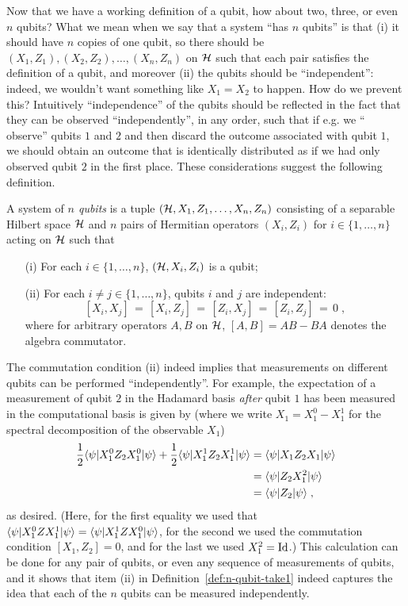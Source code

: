 Now that we have a working definition of a qubit, how about two, three, or even $n$ qubits? What we mean when we say that a system ``has $n$ qubits'' is that (i) it should have $n$ copies of one qubit, so there should be $(X_1,Z_1), (X_2,Z_2),\ldots,(X_n,Z_n)$ on $\mathcal{H}$ such that each pair satisfies the definition of a qubit, and moreover (ii) the qubits should be ``independent'': indeed, we wouldn't want something like $X_1=X_2$ to happen. How do we prevent this? Intuitively ``independence'' of the qubits should be reflected in the fact that they can be observed ``independently'', in any order, such that if e.g. we `` observe'' qubits $1$ and $2$ and then discard the outcome associated with qubit $1$, we should obtain an outcome that is identically distributed as if we had only observed qubit $2$ in the first place. These considerations suggest the following definition. 

\begin{definition}\label{def:n-qubit-take1}
A system of \emph{$n$ qubits} is a tuple $(\mathcal{H},X_1,Z_1,\ldots,X_n,Z_n)$ consisting of a separable Hilbert space $\mathcal{H}$ and $n$ pairs of Hermitian operators $(X_i,Z_i)$ for $i\in\{1,\ldots,n\}$ acting on $\mathcal{H}$ such that
\begin{enumerate}
\item[(i)] For each $i\in \{1,\ldots,n\}$, $(\mathcal{H},X_i,Z_i)$ is a qubit;
\item[(ii)] For each $i\neq j\in \{1,\ldots,n\}$, qubits $i$ and $j$ are independent:
\[ [X_i,X_j]\,=\,[X_i,Z_j]\,=\,[Z_i,X_j]\,=\,[Z_i,Z_j]\,=\,0\;,\]
where for arbitrary operators $A,B$ on $\mathcal{H}$, $[A,B]=AB-BA$ denotes the algebra commutator. 
\end{enumerate}
\end{definition}

The commutation condition (ii) indeed implies that measurements on different qubits can be performed ``independently''. For example, the expectation of a measurement of qubit $2$ in the Hadamard basis \emph{after} qubit $1$ has been measured in the computational basis is given by (where we write $X_1 = X_1^0 - X_1^1$ for the spectral decomposition of the observable $X_1$)
\begin{align*}
\frac{1}{2} \langle\psi| X_1^0 Z_2 X_1^0 |\psi\rangle + \frac{1}{2} \langle\psi| X_1^1 Z_2 X_1^1 |\psi\rangle &= \langle\psi| X_1 Z_2 X_1 |\psi\rangle \\
&= \langle\psi|  Z_2 X_1^2 |\psi\rangle\\
&= \langle\psi|  Z_2  |\psi\rangle\;,
\end{align*}
as desired. (Here, for the first equality we used that  $\langle\psi| X_1^0 Z X_1^1 |\psi\rangle  =  \langle\psi| X_1^1 Z X_1^0 |\psi\rangle $, for the second we used the commutation condition $[X_1,Z_2]=0$, and for the last we used $X_1^2=\mathop{\rm Id}\nolimits$.) This calculation can be done for any pair of qubits, or even any sequence of measurements of qubits, and it shows that item (ii) in Definition~\ref{def:n-qubit-take1} indeed captures the idea that each of the $n$ qubits can be measured independently. 

